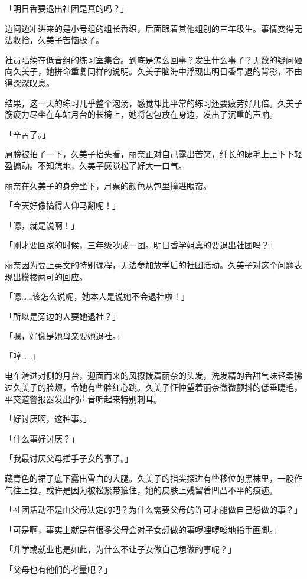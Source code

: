 \documentclass[UTF8]{ctexart}
\begin{document}
    「明日香要退出社团是真的吗？」 

    边问边冲进来的是小号组的组长香织，后面跟着其他组别的三年级生。事情变得无法收拾，久美子苦恼极了。 

    社员陆续在低音组的练习室集合。到底是怎么回事？发生什么事了？无数的疑问砸向久美子，她拼命重复同样的说明。久美子脑海中浮现出明日香早退的背影，不由得深深叹息。 

    结果，这一天的练习几乎整个泡汤，感觉却比平常的练习还要疲劳好几倍。久美子筋疲力尽坐在车站月台的长椅上，她将包包放在身边，发出了沉重的声响。 

    「辛苦了。」 

    肩膀被拍了一下，久美子抬头看，丽奈正对自己露出苦笑，纤长的睫毛上上下下轻盈搧动。不知怎地，久美子感觉松了好大一口气。 

    丽奈在久美子的身旁坐下，月票的颜色从包里撞进眼帘。 

    「今天好像搞得人仰马翻呢！」 

    「嗯，就是说啊！」 

    「刚才要回家的时候，三年级吵成一团。明日香学姐真的要退出社团吗？」 

    丽奈因为要上英文的特别课程，无法参加放学后的社团活动。久美子对这个问题表现出模棱两可的回应。 

    「嗯……该怎么说呢，她本人是说她不会退社啦！」 

    「所以是旁边的人要她退社？」 

    「嗯，好像是她母亲要她退社。」 

    「哼……」 

    电车滑进对侧的月台，迎面而来的风撩拨着丽奈的头发，洗发精的香甜气味轻柔拂过久美子的脸颊，令她有些脸红心跳。久美子怔忡望着丽奈微微颤抖的低垂睫毛，平交道警报器发出的声音听起来特别刺耳。 

    「好讨厌啊，这种事。」 

    「什么事好讨厌？」 

    「我最讨厌父母插手子女的事了。」 

    藏青色的裙子底下露出雪白的大腿。久美子的指尖探进有些移位的黑袜里，一股作气往上拉，或许是因为被松紧带箍住，她的皮肤上残留着凹凸不平的痕迹。 

    「社团活动不是由父母决定的吧？为什么需要父母的许可才能做自己想做的事？」 

    「可是啊，事实上就是有很多父母会对子女想做的事啰哩啰唆地指手画脚。」 

    「升学或就业也是如此，为什么不让子女做自己想做的事呢？」 

    「父母也有他们的考量吧？」 
\end{document}
